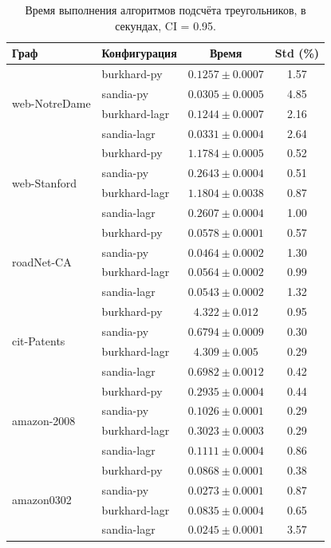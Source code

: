 \documentclass[a4paper]{article}
\begin{document}
\begin{table}[h!]
    \centering
    \small
    \caption{Время выполнения алгоритмов подсчёта треугольников, в секундах, CI = 0.95.}
    \label{tab:benchmarks}
    \begin{tabular}{llcc}
        \toprule
        \textbf{Граф} & \textbf{Конфигурация} & \textbf{Время} & \textbf{Std (\%)} \\
        \midrule
        \multirow{4}{*}{web-NotreDame}
            & burkhard-py   & $0.1257 \pm 0.0007$ & 1.57 \\
            & sandia-py     & $0.0305 \pm 0.0005$ & 4.85 \\
            & burkhard-lagr & $0.1244 \pm 0.0007$ & 2.16 \\
            & sandia-lagr   & $0.0331 \pm 0.0004$ & 2.64 \\
        \midrule
        \multirow{4}{*}{web-Stanford}
            & burkhard-py   & $1.1784 \pm 0.0005$ & 0.52 \\
            & sandia-py     & $0.2643 \pm 0.0004$ & 0.51 \\
            & burkhard-lagr & $1.1804 \pm 0.0038$ & 0.87 \\
            & sandia-lagr   & $0.2607 \pm 0.0004$ & 1.00 \\
        \midrule
        \multirow{4}{*}{roadNet-CA}
            & burkhard-py   & $0.0578 \pm 0.0001$ & 0.57 \\
            & sandia-py     & $0.0464 \pm 0.0002$ & 1.30 \\
            & burkhard-lagr & $0.0564 \pm 0.0002$ & 0.99 \\
            & sandia-lagr   & $0.0543 \pm 0.0002$ & 1.32 \\
        \midrule
        \multirow{4}{*}{cit-Patents}
            & burkhard-py   & $4.322 \pm 0.012$  & 0.95 \\
            & sandia-py     & $0.6794 \pm 0.0009$ & 0.30 \\
            & burkhard-lagr & $4.309 \pm 0.005$  & 0.29 \\
            & sandia-lagr   & $0.6982 \pm 0.0012$ & 0.42 \\
        \midrule
        \multirow{4}{*}{amazon-2008}
            & burkhard-py   & $0.2935 \pm 0.0004$ & 0.44 \\
            & sandia-py     & $0.1026 \pm 0.0001$ & 0.29 \\
            & burkhard-lagr & $0.3023 \pm 0.0003$ & 0.29 \\
            & sandia-lagr   & $0.1111 \pm 0.0004$ & 0.86 \\
        \midrule
        \multirow{4}{*}{amazon0302}
            & burkhard-py   & $0.0868 \pm 0.0001$ & 0.38 \\
            & sandia-py     & $0.0273 \pm 0.0001$ & 0.87 \\
            & burkhard-lagr & $0.0835 \pm 0.0004$ & 0.65 \\
            & sandia-lagr   & $0.0245 \pm 0.0001$ & 3.57 \\
        \bottomrule
    \end{tabular}
\end{table}
\end{document}

